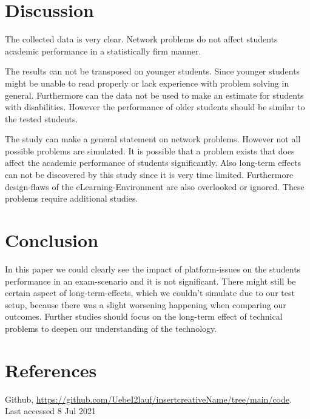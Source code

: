 \documentclass[runningheads]{llncs}
\begin{document}
\section{Discussion}
The collected data is very clear. Network problems do not affect students academic performance
in a statistically firm manner.

The results can not be transposed on younger students.
Since younger students might be unable to read properly or lack experience with problem solving
in general. Furthermore can the data not be used to make an estimate for students with disabilities.
However the performance of older students should be similar to the tested students.

The study can make a general statement on network problems. However not all possible
problems are simulated. It is possible that a problem exists that does affect the academic performance of
students significantly. Also long-term effects can not be discovered by this study since it is very time limited.
Furthermore design-flaws of the eLearning-Environment are also overlooked or ignored.
These problems require additional studies.
\section{Conclusion}
In this paper we could clearly see the impact of platform-issues on the students performance in an 
exam-scenario and it is not significant. There might still be certain aspect of long-term-effects,
which we couldn't simulate due to our test setup, because there was a slight worsening happening 
when comparing our outcomes. Further studies should focus on the long-term effect of technical problems to deepen our understanding of the technology.
\section{References}
\begin{thebibliography}{8}
    Github, \url{https://github.com/UebeI2lauf/insertcreativeName/tree/main/code}. Last accessed 8 Jul 2021
    \end{thebibliography}
\end{document}
